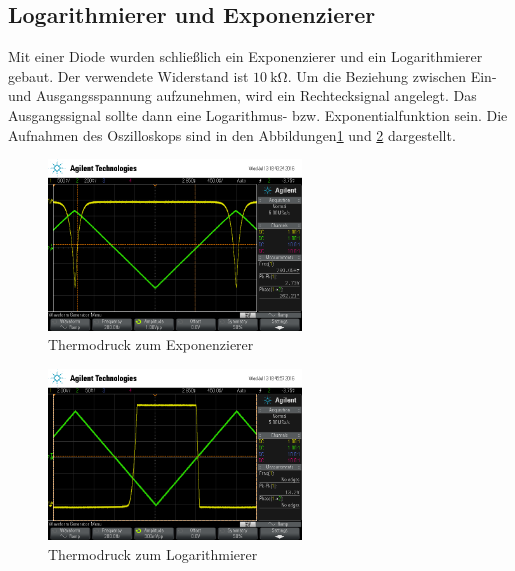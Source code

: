 \subsection{Logarithmierer und Exponenzierer}
Mit einer Diode wurden schließlich ein Exponenzierer und ein Logarithmierer gebaut.
Der verwendete Widerstand ist $\SI{10}{\kilo \ohm}$.
Um die Beziehung zwischen Ein- und Ausgangsspannung aufzunehmen, wird ein Rechtecksignal angelegt.
Das Ausgangssignal sollte dann eine Logarithmus- bzw. Exponentialfunktion sein.
Die Aufnahmen des Oszilloskops sind in den Abbildungen\ref{fig:expscope} und \ref{fig:logscope} dargestellt.
\begin{figure}
	\centering
	\includegraphics[width=0.6\textwidth]{img/scope_8_exp.png}
	\caption{Thermodruck zum Exponenzierer}
	\label{fig:expscope}
\end{figure}

\begin{figure}
	\centering
	\includegraphics[width=0.6\textwidth]{img/scope_9_log.png}
	\caption{Thermodruck zum Logarithmierer}
	\label{fig:logscope}
\end{figure}